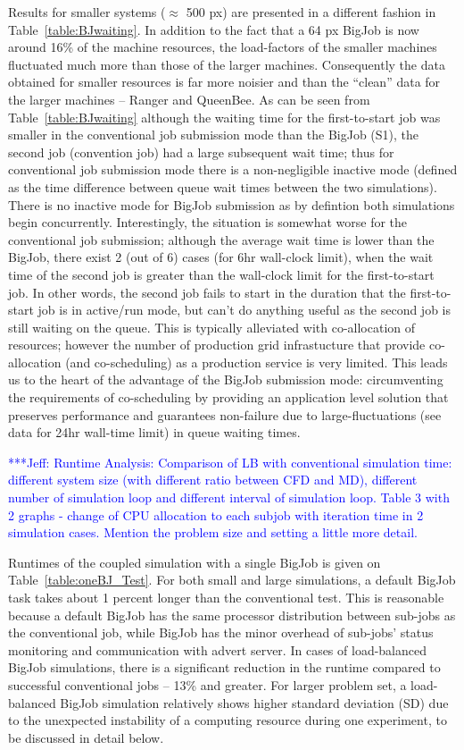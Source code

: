 \documentclass[preprint,12pt]{elsarticle}
\newcommand{\skonote}[1]{ {\textcolor{blue} { ***Jeff: #1 }}}
\newcommand{\skonote}[1]{}
\begin{document}
Results for smaller systems ($\approx$ 500 px) are presented in a different fashion in Table~\ref{table:BJwaiting}. In addition to the fact that a 64 px BigJob is now around 16\% of the machine resources, the load-factors of the smaller machines fluctuated much more than those of the larger machines. Consequently the data obtained for smaller resources is far more noisier and than the ``clean'' data for the larger machines -- Ranger and QueenBee. As can be seen from Table~\ref{table:BJwaiting} although the waiting time for the first-to-start job was smaller in the conventional job submission mode than the BigJob (S1), the second job (convention job) had a large subsequent wait time; thus for conventional job submission mode there is a non-negligible inactive mode (defined as the time difference between queue wait times between the two simulations). There is no inactive mode for BigJob submission as by defintion both simulations begin concurrently. Interestingly, the situation is somewhat worse for the conventional job submission; although the average wait time is lower than the BigJob, there exist 2 (out of 6) cases (for 6hr wall-clock limit), when the wait time of the second job is greater than the wall-clock limit for the first-to-start job. In other words, the second job fails to start in the duration that the first-to-start job is in active/run mode, but can't do anything useful as the second job is still waiting on the queue. This is typically alleviated with co-allocation of resources; however the number of production grid infrastucture that provide co-allocation (and co-scheduling) as a production service is very limited. This leads us to the heart of the advantage of the BigJob submission mode: circumventing the requirements of co-scheduling by providing an application level solution that preserves performance and guarantees non-failure due to large-fluctuations (see data for 24hr wall-time limit) in queue waiting times.



\skonote{Runtime Analysis: Comparison of LB with conventional simulation time: different system size (with different ratio between CFD and MD), different number of simulation loop and different interval of simulation loop. Table 3 with 2 graphs - change of CPU allocation to each subjob with iteration time in 2 simulation cases. Mention the problem size and setting a little more detail.}

Runtimes of the coupled simulation with a single BigJob is given on Table~\ref{table:oneBJ_Test}. For both small and large simulations, a default BigJob task takes about 1 percent longer than the conventional test. This is reasonable because a default BigJob has the same processor distribution between sub-jobs as the conventional job, while BigJob has the minor overhead of sub-jobs' status monitoring and communication with advert server. In cases of load-balanced BigJob simulations, there is a significant reduction in the runtime compared to successful conventional jobs -- 13\% and greater. For larger problem set, a load-balanced BigJob simulation relatively shows higher standard deviation (SD) due to the unexpected instability of a computing resource during one experiment, to be discussed in detail below.
\end{document}
